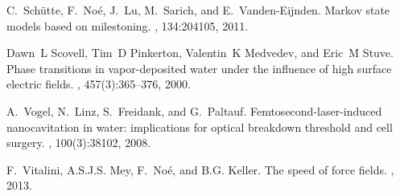 \documentclass[a4paper,preprint,unsortedaddress,onecolumn]{revtex4-1}
\begin{document}
\begin{thebibliography}{10}
C.~Sch{\"u}tte, F.~No{\'e}, J.~Lu, M.~Sarich, and E.~Vanden-Eijnden.
\newblock Markov state models based on milestoning.
, 134:204105, 2011.

Dawn~L Scovell, Tim~D Pinkerton, Valentin~K Medvedev, and Eric~M Stuve.
\newblock Phase transitions in vapor-deposited water under the influence of
  high surface electric fields.
, 457(3):365--376, 2000.

A.~Vogel, N.~Linz, S.~Freidank, and G.~Paltauf.
\newblock Femtosecond-laser-induced nanocavitation in water: implications for
  optical breakdown threshold and cell surgery.
, 100(3):38102, 2008.

F.~Vitalini, A.S.J.S. Mey, F.~No\'e, and B.G. Keller.
\newblock The speed of force fields.
, 2013.

\end{thebibliography}
\end{document}
